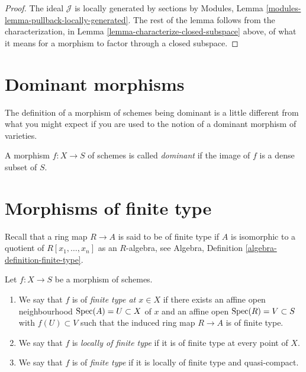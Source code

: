 \begin{proof}
The ideal $\mathcal{J}$ is locally generated by sections
by Modules, Lemma \ref{modules-lemma-pullback-locally-generated}.
The rest of the lemma follows from the characterization,
in Lemma \ref{lemma-characterize-closed-subspace} above,
of what it means for a morphism to factor through a closed
subspace.
\end{proof}

\section{Dominant morphisms}
\label{section-dominant}

\noindent
The definition of a morphism of schemes being dominant is a little
different from what you might expect if you are used to the notion
of a dominant morphism of varieties.

\begin{definition}
\label{definition-dominant}
A morphism $f : X \to S$ of schemes is called {\it dominant} if the
image of $f$ is a dense subset of $S$.
\end{definition}

\section{Morphisms of finite type}
\label{section-finite-type}

\noindent
Recall that a ring map $R \to A$ is said to be of finite type if
$A$ is isomorphic to a quotient of $R[x_1, \ldots, x_n]$ as an $R$-algebra, see
Algebra, Definition \ref{algebra-definition-finite-type}.

\begin{definition}
\label{definition-finite-type}
Let $f : X \to S$ be a morphism of schemes.
\begin{enumerate}
\item We say that $f$ is of {\it finite type at $x \in X$} if
there exists an affine open neighbourhood $\mathop{\mathrm{Spec}}(A) = U \subset X$
of $x$ and an affine open $\mathop{\mathrm{Spec}}(R) = V \subset S$
with $f(U) \subset V$ such that the induced ring map
$R \to A$ is of finite type.
\item We say that $f$ is {\it locally of finite type} if it is
of finite type at every point of $X$.
\item We say that $f$ is of {\it finite type} if it is locally of
finite type and quasi-compact.
\end{enumerate}
\end{definition}

